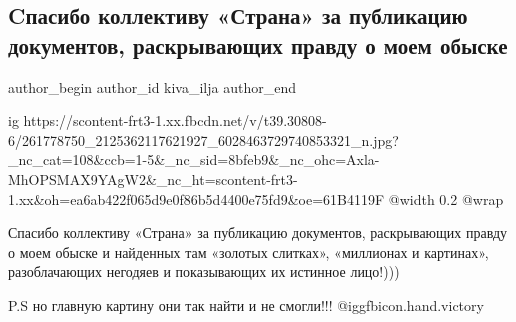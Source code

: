  
 
 
 
 
 
\subsection{Cпасибо коллективу «Страна» за публикацию документов, раскрывающих правду о моем обыске}
\label{sec:02_12_2021.fb.kiva_ilja.1.spasibo_strana}
 
\ifcmt
 author_begin
   author_id kiva_ilja
 author_end
\fi

\ifcmt
  ig https://scontent-frt3-1.xx.fbcdn.net/v/t39.30808-6/261778750_2125362117621927_6028463729740853321_n.jpg?_nc_cat=108&ccb=1-5&_nc_sid=8bfeb9&_nc_ohc=Axla-MhOPSMAX9YAgW2&_nc_ht=scontent-frt3-1.xx&oh=ea6ab422f065d9e0f86b5d4400e75fd9&oe=61B4119F
  @width 0.2
  @wrap 
\fi

Спасибо коллективу «Страна» за публикацию документов, раскрывающих правду о
моем обыске и найденных там «золотых слитках», «миллионах и картинах»,
разоблачающих негодяев и показывающих их истинное лицо!))) 

P.S но главную картину они так найти и не смогли!!! @igg{fbicon.hand.victory}

\vspace{2cm}

